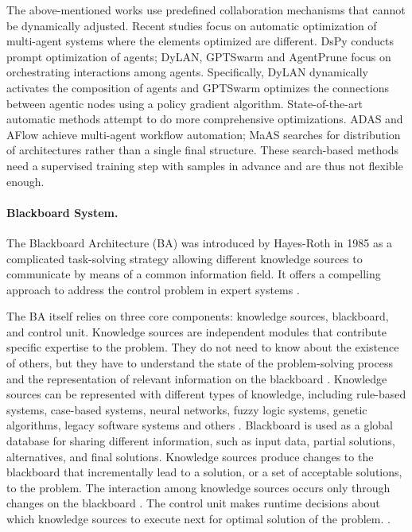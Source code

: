 \documentclass[11pt]{article}
\begin{document}
The above-mentioned works use predefined collaboration mechanisms that cannot be dynamically adjusted. Recent studies focus on automatic optimization of multi-agent systems where the elements optimized are different. DsPy\citep{khattab2024dspy}  conducts prompt optimization of agents; DyLAN\citep{liu2024a}, GPTSwarm\citep{zhuge2024gptswarm} and AgentPrune\citep{zhang2025cut} focus on orchestrating interactions among agents. Specifically, DyLAN dynamically activates the composition of agents and GPTSwarm optimizes the connections between agentic nodes using a policy gradient algorithm. State-of-the-art automatic methods attempt to do more comprehensive optimizations. ADAS\citep{hu2025automated} and AFlow\citep{zhang2025aflow} achieve multi-agent workflow automation; MaAS\citep{zhang2025multi} searches for distribution of architectures rather than a single final structure. These search-based methods need a supervised training step with samples in advance and are thus not flexible enough.
\paragraph{Blackboard System.}
The Blackboard Architecture (BA) was introduced by Hayes-Roth in 1985 \citep{hayes-roth_blackboard_1985} as a complicated task-solving strategy allowing different knowledge sources to communicate by means of a common information field. It offers a compelling approach to address the control problem in expert systems \citep{muhd_mukhtar_advancing_2025}.

The BA itself relies on three core components: knowledge sources, blackboard, and control unit.
Knowledge sources are independent modules that contribute specific expertise to the problem. They do not need to know about the existence of others, but they have to understand the state of the problem-solving process and the representation of relevant information on the blackboard \citep{corkillblackboard}. Knowledge sources can be represented with different types of knowledge, including rule-based systems, case-based systems, neural networks, fuzzy logic systems, genetic algorithms, legacy software systems and others \citep{rudenko2008blackboard}.
Blackboard is used as a global database for sharing different information, such as input data, partial solutions, alternatives, and final solutions. Knowledge sources produce changes to the blackboard that incrementally lead to a solution, or a set of acceptable solutions, to the problem. The interaction among knowledge sources occurs only through changes on the blackboard \citep{nii1986blackboard}. 
The control unit makes runtime decisions about which knowledge sources to execute next for optimal solution of the problem. \citep{corkillblackboard}. 
\end{document}
